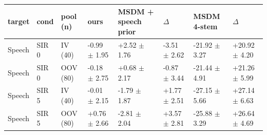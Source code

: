 \begin{tabular}{llllllll}
\toprule
target & cond & pool (n) & ours & MSDM + speech prior & $\Delta$ & MSDM 4-stem & $\Delta$\\
\midrule
Speech & SIR 0 & IV (40) & -0.99 $\pm$ 1.95 & +2.52 $\pm$ 1.76 & -3.51 $\pm$ 2.62 & -21.92 $\pm$ 3.27 & +20.92 $\pm$ 4.20\\
Speech & SIR 0 & OOV (80) & -0.18 $\pm$ 2.75 & +0.68 $\pm$ 2.17 & -0.87 $\pm$ 3.44 & -21.44 $\pm$ 4.91 & +21.26 $\pm$ 5.99\\
Speech & SIR 5 & IV (40) & -0.01 $\pm$ 2.15 & -1.79 $\pm$ 1.87 & +1.77 $\pm$ 2.51 & -27.15 $\pm$ 5.66 & +27.14 $\pm$ 6.63\\
Speech & SIR 5 & OOV (80) & +0.76 $\pm$ 2.66 & -2.81 $\pm$ 2.04 & +3.57 $\pm$ 2.81 & -25.88 $\pm$ 3.29 & +26.64 $\pm$ 4.69\\
\bottomrule
\end{tabular}
